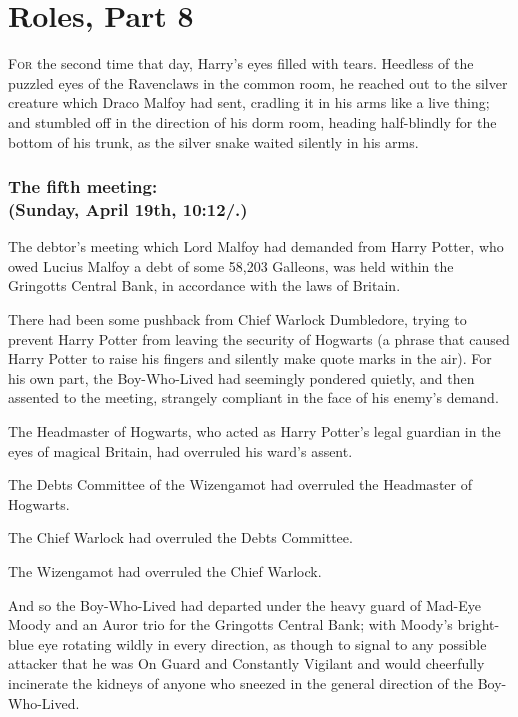 \chapter{Roles, Part 8}


\lettrine{F}{or} the second
time that day, Harry's eyes filled with tears. Heedless of the puzzled eyes of
the Ravenclaws in the common room, he reached out to the silver creature which
Draco Malfoy had sent, cradling it in his arms like a live thing; and stumbled
off in the direction of his dorm room, heading half-blindly for the bottom of
his trunk, as the silver snake waited silently in his arms.
\sbreak
\subsection{The fifth meeting:\\
(Sunday, April 19th, 10:12\AM/.)}

The debtor's meeting which Lord Malfoy had demanded from Harry Potter, who owed
Lucius Malfoy a debt of some 58,203 Galleons, was held within the Gringotts
Central Bank, in accordance with the laws of Britain.

There had been some pushback from Chief Warlock Dumbledore, trying to prevent
Harry Potter from leaving the security of Hogwarts (a phrase that caused Harry
Potter to raise his fingers and silently make quote marks in the air). For his
own part, the Boy-Who-Lived had seemingly pondered quietly, and then assented
to the meeting, strangely compliant in the face of his enemy's demand.

The Headmaster of Hogwarts, who acted as Harry Potter's legal guardian in the
eyes of magical Britain, had overruled his ward's assent.

The Debts Committee of the Wizengamot had overruled the Headmaster of Hogwarts.

The Chief Warlock had overruled the Debts Committee.

The Wizengamot had overruled the Chief Warlock.

And so the Boy-Who-Lived had departed under the heavy guard of Mad-Eye Moody
and an Auror trio for the Gringotts Central Bank; with Moody's bright-blue eye
rotating wildly in every direction, as though to signal to any possible
attacker that he was On Guard and Constantly Vigilant and would cheerfully
incinerate the kidneys of anyone who sneezed in the general direction of the
Boy-Who-Lived.


